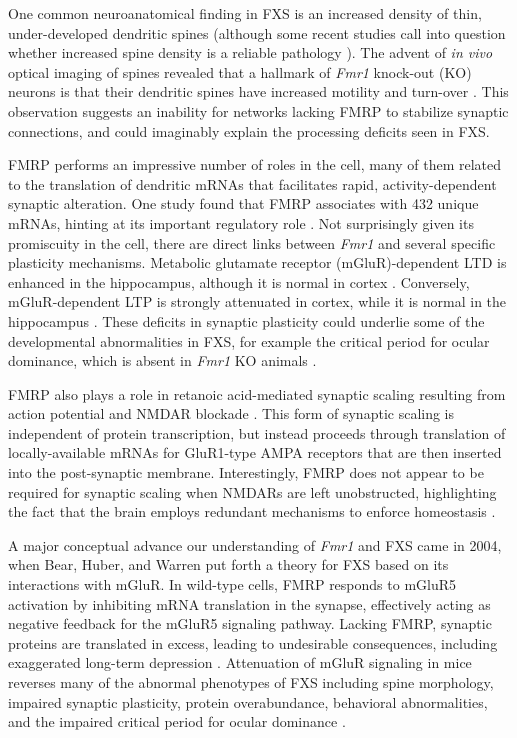 One common neuroanatomical finding in FXS is an increased density of thin, under-developed dendritic spines \cite{Hinton1991, Comery1997, Dolen2007, Liu2011} (although some recent studies call into question whether increased spine density is a reliable pathology \cite{Cruz-Martin2010, Harlow2010a, Meredith2007}). The advent of \textit{in vivo} optical imaging of spines revealed that a hallmark of \textit{Fmr1} knock-out (KO) neurons is that their dendritic spines have increased motility and turn-over \cite{Cruz-Martin2010, Pan2010}. This observation suggests an inability for networks lacking FMRP to stabilize synaptic connections, and could imaginably explain the processing deficits seen in FXS.

FMRP performs an impressive number of roles in the cell, many of them related to the translation of dendritic mRNAs that facilitates rapid, activity-dependent synaptic alteration. One study found that FMRP associates with 432 unique mRNAs, hinting at its important regulatory role \cite{Brown2001}. Not surprisingly given its promiscuity in the cell, there are direct links between \textit{Fmr1} and several specific plasticity mechanisms. Metabolic glutamate receptor (mGluR)-dependent LTD is enhanced in the hippocampus, although it is normal in cortex \cite{Huber2002}. Conversely, mGluR-dependent LTP is strongly attenuated in cortex, while it is normal in the hippocampus \cite{Li2002, Zhao2005, Wilson2007}. These deficits in synaptic plasticity could underlie some of the developmental abnormalities in FXS, for example the critical period for ocular dominance, which is absent in \textit{Fmr1} KO animals \cite{Dolen2007}.

FMRP also plays a role in retanoic acid-mediated synaptic scaling resulting from action potential and NMDAR blockade \cite{Soden2010}. This form of synaptic scaling is independent of protein transcription, but instead proceeds through translation of locally-available mRNAs for GluR1-type AMPA receptors that are then inserted into the post-synaptic membrane. Interestingly, FMRP does not appear to be required for synaptic scaling when NMDARs are left unobstructed, highlighting the fact that the brain employs redundant mechanisms to enforce homeostasis \cite{Soden2010}.

A major conceptual advance our understanding of \textit{Fmr1} and FXS came in 2004, when Bear, Huber, and Warren put forth a theory for FXS based on its interactions with mGluR. In wild-type cells, FMRP responds to mGluR5 activation by inhibiting mRNA translation in the synapse, effectively acting as negative feedback for the mGluR5 signaling pathway. Lacking FMRP, synaptic proteins are translated in excess, leading to undesirable consequences, including exaggerated long-term depression \cite{Huber2002, Bear2004}. Attenuation of mGluR signaling in mice reverses many of the abnormal phenotypes of FXS including spine morphology, impaired synaptic plasticity, protein overabundance, behavioral abnormalities, and the impaired critical period for ocular dominance \cite{DeVrij2008, Dolen2007, Su2011}.

